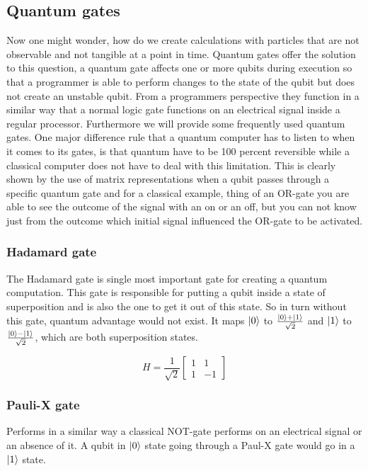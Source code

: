 \subsection{Quantum gates}

Now one might wonder, how do we create calculations with particles that are not observable and not tangible at a point in time. Quantum gates offer the solution to this question, a quantum gate affects one or more qubits during execution so that a programmer is able to perform changes to the state of the qubit but does not create an unstable qubit. From a programmers perspective they function in a similar way that a normal logic gate functions on an electrical signal inside a regular processor. Furthermore we will provide some frequently used quantum gates. One major difference rule that a quantum computer has to listen to when it comes to its gates, is that quantum have to be 100 percent reversible while a classical computer does not have to deal with this limitation. This is clearly shown by the use of matrix representations when a qubit passes through a specific quantum gate and for a classical example, thing of an OR-gate you are able to see the outcome of the signal with an on or an off, but you can not know just from the outcome which initial signal influenced the OR-gate to be activated.

\subsubsection{Hadamard gate}
The Hadamard gate is single most important gate for creating a quantum computation. This gate is responsible for putting a qubit inside a state of superposition and is also the one to get it out of this state. So in turn without this gate, quantum advantage would not exist. It maps  $\ket{0}$ to $\frac{\ket{0} + \ket{1}}{\sqrt{2}}$ and $\ket{1}$ to $\frac{\ket{0}-\ket{1}}{\sqrt{2}}$, which are both superposition states.

\[
H=\frac{1}{\sqrt{2}}\begin{bmatrix}
1 & 1 \\
1 & -1
\end{bmatrix}
\]

\subsubsection{Pauli-X gate}
Performs in a similar way a classical NOT-gate performs on an electrical signal or an absence of it. A qubit in $\ket{0}$ state going through a Paul-X gate would go in a $\ket{1}$ state.

